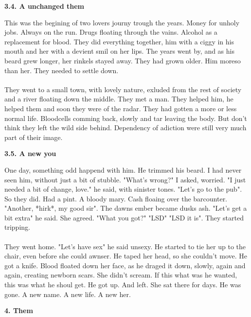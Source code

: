 \documentclass[]{article}
\begin{document}
\begin{center}
	\textbf{3.4. A unchanged them}
\end{center}

This was the begining of two lovers journy trough the years. Money for unholy jobs. Always on the run. Drugs floating through the vains. Alcohol as a replacement for blood. They did everything together, him with a ciggy in his mouth and her with a devient smil on her lips. The years went by, and as his beard grew longer, her rinkels stayed away. They had grown older. Him moreso than her. They needed to settle down. 
\\ \\
They went to a small town, with lovely nature, exluded from the rest of society and a river floating down the middle. They met a man. They helped him, he helped them and soon they were of the radar. They had gotten a more or less normal life. Bloodcells comming back, slowly and tar leaving the body. But don't think they left the wild side behind. Dependency of adiction were still very much part of their image.

\begin{center}
	\textbf{3.5. A new you}
\end{center}

One day, something odd happend with him. He trimmed his beard. I had never seen him, without just a bit of stubble. "What's wrong?" I asked, worried. "I just needed a bit of change, love." he said, with sinister tones. "Let's go to the pub". So they did. Had a pint. A bloody mary. Cash floaing over the barcounter. "Another, *hirk*, my good sir". The dawns ember became dusks ash. "Let's get a bit extra" he said. She agreed. "What you got?" "LSD" "LSD it is". They started tripping. 
\\ \\
They went home. "Let's have sex" he said unsexy. He started to tie her up to the chair, even before she could awnser. He taped her head, so she couldn't move. He got a knife. Blood floated down her face, as he draged it down, slowly, again and again, creating newborn scars. She didn't scream. If this what was he wanted, this was what he shoul get. He got up. And left. She sat there for days. He was gone. A new name. A new life. A new her.

\newpage

\begin{center}
	\large\textbf{4. Them}
\end{center}
\end{document}
